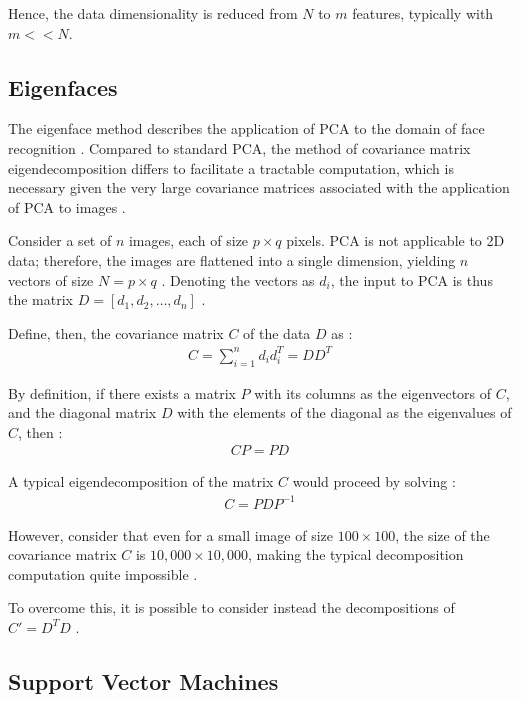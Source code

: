 Hence, the data dimensionality is reduced from $N$ to $m$ features, typically with $m<<N$.

\newpage
\subsection{Eigenfaces}

The eigenface method describes the application of PCA to the domain of face recognition \cite{lovell_2008}. Compared to standard PCA, the method of covariance matrix eigendecomposition differs to facilitate a tractable computation, which is necessary given the very large covariance matrices associated with the application of PCA to images \cite{lovell_2008}.

Consider a set of $n$ images, each of size $p\times q$ pixels. PCA is not applicable to 2D data; therefore, the images are flattened into a single dimension, yielding $n$ vectors of size $N=p\times q$ \cite{lovell_2008}. Denoting the vectors as $d_i$, the input to PCA is thus the matrix $D=[d_1, d_2, \ldots, d_n]$ \cite{lovell_2008}.

Define, then, the covariance matrix $C$ of the data $D$ as \cite{lovell_2008}:
\begin{align}
  C = \sum_{i=1}^n d_i d_i^T = D D^T
\end{align}

By definition, if there exists a matrix $P$ with its columns as the eigenvectors of $C$, and the diagonal matrix $D$ with the elements of the diagonal as the eigenvalues of $C$, then \cite{wolfram_2023}:
\begin{align}
  C P = P D
\end{align}

A typical eigendecomposition of the matrix $C$ would proceed by solving \cite{wolfram_2023}:
\begin{align}
  C = P D P^{-1}
\end{align}

However, consider that even for a small image of size $100\times100$, the size of the covariance matrix $C$ is $10,000\times10,000$, making the typical decomposition computation quite impossible \cite{lovell_2008}.

To overcome this, it is possible to consider instead the decompositions of $C'=D^TD$ \cite{lovell_2008}.

\newpage
\subsection{Support Vector Machines}

